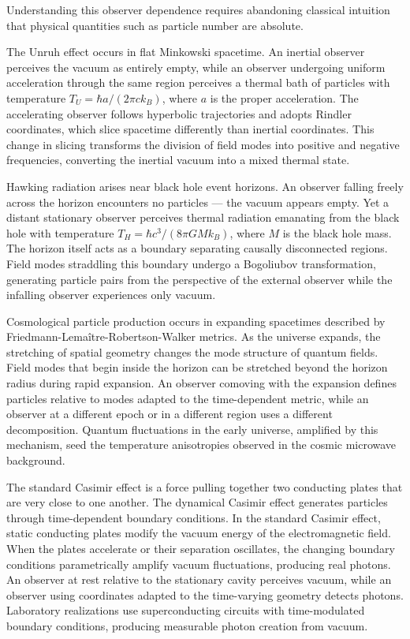 Understanding this observer dependence requires abandoning classical intuition that physical quantities such as particle number are absolute.

The Unruh effect occurs in flat Minkowski spacetime. An inertial observer perceives the vacuum as entirely empty, while an observer undergoing uniform acceleration through the same region perceives a thermal bath of particles with temperature $T_U = \hbar a/(2\pi c k_B)$, where $a$ is the proper acceleration. The accelerating observer follows hyperbolic trajectories and adopts Rindler coordinates, which slice spacetime differently than inertial coordinates. This change in slicing transforms the division of field modes into positive and negative frequencies, converting the inertial vacuum into a mixed thermal state.

Hawking radiation arises near black hole event horizons. An observer falling freely across the horizon encounters no particles — the vacuum appears empty. Yet a distant stationary observer perceives thermal radiation emanating from the black hole with temperature $T_H = \hbar c^3/(8\pi G M k_B)$, where $M$ is the black hole mass. The horizon itself acts as a boundary separating causally disconnected regions. Field modes straddling this boundary undergo a Bogoliubov transformation, generating particle pairs from the perspective of the external observer while the infalling observer experiences only vacuum.

Cosmological particle production occurs in expanding spacetimes described by Friedmann-Lemaître-Robertson-Walker metrics. As the universe expands, the stretching of spatial geometry changes the mode structure of quantum fields. Field modes that begin inside the horizon can be stretched beyond the horizon radius during rapid expansion. An observer comoving with the expansion defines particles relative to modes adapted to the time-dependent metric, while an observer at a different epoch or in a different region uses a different decomposition. Quantum fluctuations in the early universe, amplified by this mechanism, seed the temperature anisotropies observed in the cosmic microwave background.

The standard Casimir effect is a force pulling together two conducting plates that are very close to one another. The dynamical Casimir effect generates particles through time-dependent boundary conditions. In the standard Casimir effect, static conducting plates modify the vacuum energy of the electromagnetic field. When the plates accelerate or their separation oscillates, the changing boundary conditions parametrically amplify vacuum fluctuations, producing real photons. An observer at rest relative to the stationary cavity perceives vacuum, while an observer using coordinates adapted to the time-varying geometry detects photons. Laboratory realizations use superconducting circuits with time-modulated boundary conditions, producing measurable photon creation from vacuum.

